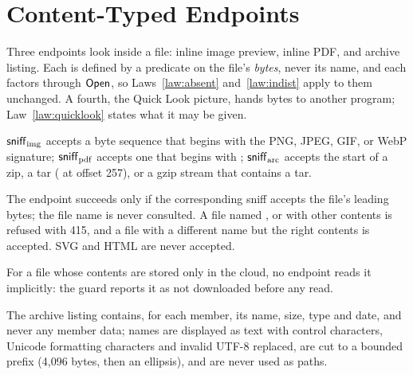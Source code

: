 \section{Content-Typed Endpoints}
\label{sec:content}

Three endpoints look inside a file: inline image preview, inline PDF, and
archive listing.  Each is defined by a predicate on the file's \emph{bytes},
never its name, and each factors through $\mathsf{Open}$, so Laws~\ref{law:absent}
and~\ref{law:indist} apply to them unchanged.  A fourth, the Quick Look picture,
hands bytes to another program; Law~\ref{law:quicklook} states what it may be
given.

\begin{definition}[Sniff]
$\mathsf{sniff}_{\mathrm{img}}$ accepts a byte sequence that begins with the PNG, JPEG,
GIF, or WebP signature; $\mathsf{sniff}_{\mathrm{pdf}}$ accepts one that begins with
; $\mathsf{sniff}_{\mathrm{arc}}$ accepts the start of a zip, a tar
( at offset 257), or a gzip stream that contains a tar.
\end{definition}

\begin{law}
\label{law:sniff}
The endpoint succeeds only if the corresponding sniff accepts the file's leading
bytes; the file name is never consulted.  A file named ,
 or  with other contents is refused with 415, and a file
with a different name but the right contents is accepted.  SVG and HTML are never
accepted.
\end{law}

\begin{law}
\label{law:dataless}
For a file whose contents are stored only in the cloud, no endpoint reads it
implicitly: the guard reports it as not downloaded before any read.
\end{law}

\begin{law}
\label{law:archive-names}
The archive listing contains, for each member, its name, size, type and date,
and never any member data; names are displayed as text with control characters,
Unicode formatting characters and invalid UTF-8 replaced, are cut to a bounded
prefix (4{,}096 bytes, then an ellipsis), and are never used as paths.
\end{law}

